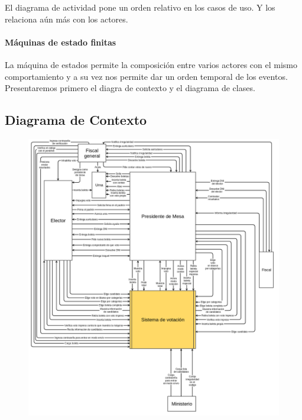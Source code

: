 El diagrama de actividad pone un orden relativo en los casos de uso. Y los relaciona aún más con los actores.

\paragraph{Máquinas de estado finitas}

La máquina de estados permite la composición entre varios actores con el mismo comportamiento y a su vez nos permite dar un orden temporal de los eventos. \\


Presentaremos primero el diagra de contexto y el diagrama de clases.


\newpage
\subsection{Diagrama de Contexto}

\begin{figure}[h!]
\centering
\includegraphics[scale=0.36]{imagenes/contexto1}
\end{figure}

\newpage

